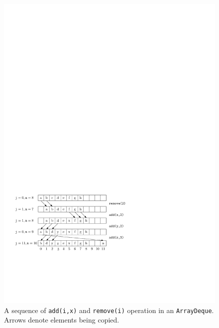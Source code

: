 \begin{figure}
  \begin{center}
    \includegraphics{figs/arraydeque}
  \end{center}
  \caption{A sequence of \mbox{\texttt{add({\color{var}i},{\color{var}x})}} and \mbox{\texttt{remove({\color{var}i})}} operation in an
  \mbox{\texttt{ArrayDeque}}.  Arrows denote elements being copied.}
\end{figure}


